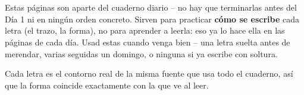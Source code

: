 \section*{\lblTituloTrazo}

Estas páginas son aparte del cuaderno diario -- no hay que terminarlas
antes del Día 1 ni en ningún orden concreto. Sirven para practicar
\textbf{cómo se escribe} cada letra (el trazo, la forma), no para
aprender a leerla: eso ya lo hace ella en las páginas de cada día. Usad
estas cuando venga bien -- una letra suelta antes de merendar, varias
seguidas un domingo, o ninguna si ya escribe con soltura.

Cada letra es el contorno real de la misma fuente que usa todo el
cuaderno, así que la forma coincide exactamente con la que ve al leer.
\newpage
